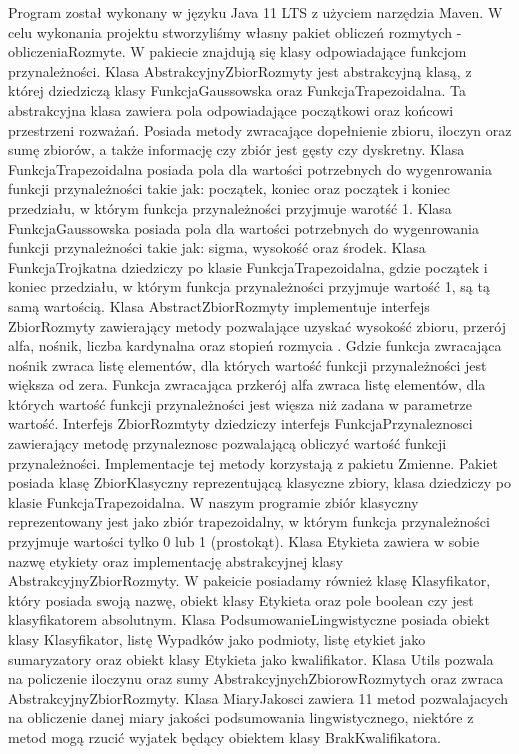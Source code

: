 \documentclass{classrep}
\begin{document}
Program został wykonany w języku Java 11 LTS z użyciem narzędzia Maven. W celu wykonania projektu stworzyliśmy własny pakiet obliczeń rozmytych - obliczeniaRozmyte. W pakiecie znajdują się klasy odpowiadające funkcjom przynależności. Klasa AbstrakcyjnyZbiorRozmyty jest abstrakcyjną klasą, z której dziedziczą klasy FunkcjaGaussowska oraz FunkcjaTrapezoidalna. Ta abstrakcyjna klasa zawiera pola odpowiadające początkowi oraz końcowi przestrzeni rozważań\cite{fuzzy}. Posiada metody zwracające dopełnienie zbioru, iloczyn oraz sumę zbiorów, a także informację czy zbiór jest gęsty czy dyskretny. Klasa FunkcjaTrapezoidalna posiada pola dla wartości potrzebnych do wygenrowania funkcji przynależności takie jak: początek, koniec oraz początek i koniec przedziału, w którym funkcja przynależności przyjmuje warotść 1. Klasa FunkcjaGaussowska posiada pola dla wartości potrzebnych do wygenrowania funkcji przynależności takie jak: sigma, wysokość oraz środek. Klasa FunkcjaTrojkatna dziedziczy po klasie FunkcjaTrapezoidalna, gdzie początek i koniec przedziału, w którym funkcja przynależności przyjmuje wartość 1, są tą samą wartością. Klasa AbstractZbiorRozmyty implementuje interfejs ZbiorRozmyty zawierający metody pozwalające uzyskać wysokość zbioru\cite{fuzzy}, przerój alfa, nośnik, liczba kardynalna\cite{fuzzy} oraz stopień rozmycia \cite{niewiadomski zbiory rozmyte typu 2}. Gdzie funkcja zwracająca nośnik zwraca listę elementów, dla których wartość funkcji przynależności jest większa od zera. Funkcja zwracająca przkerój alfa zwraca listę elementów, dla których wartość funkcji przynależności jest więsza niż zadana w parametrze wartość. Interfejs ZbiorRozmtyty dziedziczy interfejs FunkcjaPrzynaleznosci zawierający metodę przynaleznosc pozwalającą obliczyć wartość funkcji przynależności. Implementacje tej metody korzystają z pakietu Zmienne. Pakiet posiada klasę ZbiorKlasyczny reprezentującą klasyczne zbiory, klasa dziedziczy po klasie FunkcjaTrapezoidalna. W naszym programie zbiór klasyczny reprezentowany jest jako zbiór trapezoidalny, w którym funkcja przynależności przyjmuje wartości tylko 0 lub 1 (prostokąt). Klasa Etykieta zawiera w sobie nazwę etykiety oraz implementację abstrakcyjnej klasy AbstrakcyjnyZbiorRozmyty. W pakeicie posiadamy również klasę Klasyfikator, który posiada swoją nazwę, obiekt klasy Etykieta oraz pole boolean czy jest klasyfikatorem absolutnym. Klasa PodsumowanieLingwistyczne posiada obiekt klasy Klasyfikator, listę Wypadków jako podmioty, listę etykiet jako sumaryzatory oraz obiekt klasy Etykieta jako kwalifikator. Klasa Utils pozwala na policzenie iloczynu oraz sumy AbstrakcyjnychZbiorowRozmytych oraz zwraca AbstrakcyjnyZbiorRozmyty. Klasa MiaryJakosci zawiera 11 metod pozwalajacych na obliczenie danej miary jakości podsumowania lingwistycznego, niektóre z metod mogą rzucić wyjatek będący obiektem klasy BrakKwalifikatora. 
\end{document}
